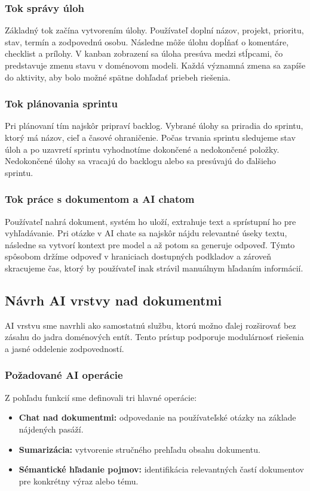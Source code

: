 \documentclass[12pt, a4paper]{article}
\begin{document}
\begin{titlepage}
\subsubsection{Tok správy úloh}
Základný tok začína vytvorením úlohy. Používateľ doplní názov, projekt, prioritu, stav, termín a zodpovednú osobu. Následne môže úlohu dopĺňať o komentáre, checklist a prílohy. V kanban zobrazení sa úloha presúva medzi stĺpcami, čo predstavuje zmenu stavu v doménovom modeli. Každá významná zmena sa zapíše do aktivity, aby bolo možné spätne dohľadať priebeh riešenia.

\subsubsection{Tok plánovania sprintu}
Pri plánovaní tím najskôr pripraví backlog. Vybrané úlohy sa priradia do sprintu, ktorý má názov, cieľ a časové ohraničenie. Počas trvania sprintu sledujeme stav úloh a po uzavretí sprintu vyhodnotíme dokončené a nedokončené položky. Nedokončené úlohy sa vracajú do backlogu alebo sa presúvajú do ďalšieho sprintu.

\subsubsection{Tok práce s dokumentom a AI chatom}
Používateľ nahrá dokument, systém ho uloží, extrahuje text a sprístupní ho pre vyhľadávanie. Pri otázke v AI chate sa najskôr nájdu relevantné úseky textu, následne sa vytvorí kontext pre model a až potom sa generuje odpoveď. Týmto spôsobom držíme odpoveď v hraniciach dostupných podkladov a zároveň skracujeme čas, ktorý by používateľ inak strávil manuálnym hľadaním informácií.

\subsection{Návrh AI vrstvy nad dokumentmi}
AI vrstvu sme navrhli ako samostatnú službu, ktorú možno ďalej rozširovať bez zásahu do jadra doménových entít. Tento prístup podporuje modulárnosť riešenia a jasné oddelenie zodpovedností.

\subsubsection{Požadované AI operácie}
Z pohľadu funkcií sme definovali tri hlavné operácie:
\begin{itemize}
    \item \textbf{Chat nad dokumentmi:} odpovedanie na používateľské otázky na základe nájdených pasáží.
    \item \textbf{Sumarizácia:} vytvorenie stručného prehľadu obsahu dokumentu.
    \item \textbf{Sémantické hľadanie pojmov:} identifikácia relevantných častí dokumentov pre konkrétny výraz alebo tému.
\end{itemize}


\end{titlepage}
\end{document}
